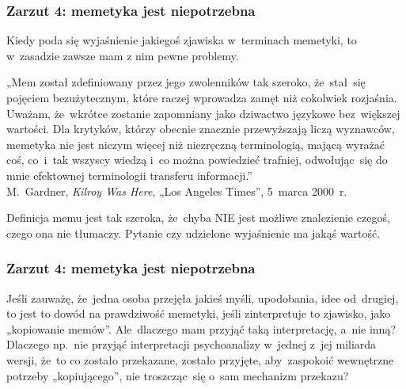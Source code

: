 \documentclass[10pt,t]{beamer}
\begin{document}
\begin{frame}
  \frametitle{Zarzut 4: memetyka jest niepotrzebna}


  Kiedy poda się wyjaśnienie jakiegoś zjawiska w~terminach memetyki, to
  w~zasadzie zawsze mam z nim pewne problemy.

  „Mem został zdefiniowany przez jego zwolenników tak szeroko,
  że~stał~się pojęciem bezużytecznym, które raczej wprowadza zamęt
  niż cokolwiek rozjaśnia. Uważam, że~wkrótce zostanie zapomniany
  jako dziwactwo językowe bez~większej wartości. Dla krytyków,
  którzy obecnie znacznie przewyższają liczą wyznawców, memetyka nie
  jest niczym więcej niż niezręczną terminologią, mającą wyrażać
  coś, co~i~tak wszyscy wiedzą i~co można powiedzieć trafniej,
  odwołując~się do mnie efektownej terminologii transferu informacji.” \\
  M.~Gardner, \textit{Kilroy Was Here}, „Los Angeles Times”, 5~marca 2000~r.

  Definicja memu jest tak szeroka, że~chyba NIE jest możliwe
  znalezienie czegoś, czego ona nie tłumaczy. Pytanie czy udzielone
  wyjaśnienie ma jakąś wartość.

\end{frame}





\begin{frame}
  \frametitle{Zarzut 4: memetyka jest niepotrzebna}


  Jeśli zauważę, że~jedna osoba przejęła jakieś myśli,
  upodobania, idee od~drugiej, to jest to dowód na prawdziwość
  memetyki, jeśli zinterpretuje to zjawisko, jako „kopiowanie
  memów”. Ale~dlaczego mam przyjąć taką interpretację, a~nie
  inną? Dlaczego np.~nie przyjąć interpretacji psychoanalizy
  w~jednej z~jej miliarda wersji, że~to co zostało przekazane,
  zostało przyjęte, aby~zaspokoić wewnętrzne potrzeby
  „kopiującego”, nie troszcząc~się o~sam mechanizm przekazu?


\end{frame}
\end{document}
